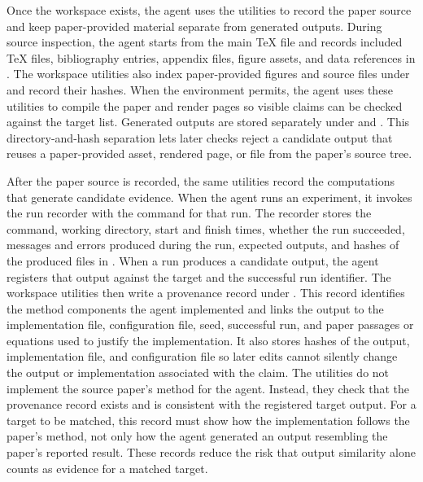 \documentclass[authoryear,5p,times,nopreprintline]{elsarticle}
\begin{document}
Once the workspace exists, the agent uses the utilities to record the paper source and keep paper-provided material separate from generated outputs.
During source inspection, the agent starts from the main TeX file and records included TeX files, bibliography entries, appendix files, figure assets, and data references in .
The workspace utilities also index paper-provided figures and source files under  and record their hashes.
When the environment permits, the agent uses these utilities to compile the paper and render pages so visible claims can be checked against the target list.
Generated outputs are stored separately under  and .
This directory-and-hash separation lets later checks reject a candidate output that reuses a paper-provided asset, rendered page, or file from the paper's source tree.

After the paper source is recorded, the same utilities record the computations that generate candidate evidence.
When the agent runs an experiment, it invokes the run recorder with the command for that run.
The recorder stores the command, working directory, start and finish times, whether the run succeeded, messages and errors produced during the run, expected outputs, and hashes of the produced files in .
When a run produces a candidate output, the agent registers that output against the target and the successful run identifier.
The workspace utilities then write a provenance record under .
This record identifies the method components the agent implemented and links the output to the implementation file, configuration file, seed, successful run, and paper passages or equations used to justify the implementation.
It also stores hashes of the output, implementation file, and configuration file so later edits cannot silently change the output or implementation associated with the claim.
The utilities do not implement the source paper's method for the agent.
Instead, they check that the provenance record exists and is consistent with the registered target output.
For a target to be matched, this record must show how the implementation follows the paper's method, not only how the agent generated an output resembling the paper's reported result.
These records reduce the risk that output similarity alone counts as evidence for a matched target.
\end{document}
